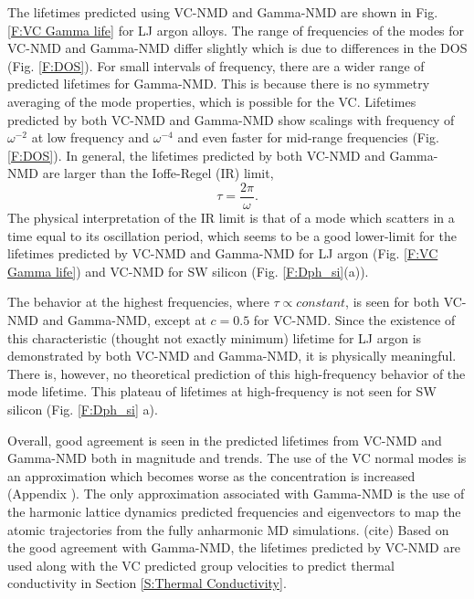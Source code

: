 \documentclass[aps,prb,twocolumn,superscriptaddress,amsmath,amssymb,floatfix]{revtex4}
\begin{document}
The lifetimes predicted using VC-NMD and Gamma-NMD  
are shown in Fig. \ref{F:VC Gamma life} for LJ argon alloys. 
The range of frequencies of the modes for 
VC-NMD and Gamma-NMD differ slightly  
which is due to differences in the DOS (Fig. \ref{F:DOS}). 
For small intervals of frequency, there are a wider range of 
predicted lifetimes for Gamma-NMD. This is because there is no symmetry 
averaging of the mode properties, which is possible for the VC.
Lifetimes predicted by both VC-NMD and Gamma-NMD show scalings with 
frequency of $\omega^{-2}$ at low frequency and $\omega^{-4}$ and 
even faster for mid-range frequencies (Fig. \ref{F:DOS}). 
In general, the lifetimes predicted by both VC-NMD and Gamma-NMD  
are larger than the Ioffe-Regel (IR) limit,
\cite{taraskin_determination_1999} 
\begin{equation}\label{EQ:IR}
\tau = \frac{2\pi}{\omega}.
\end{equation}
The physical interpretation of the IR limit is that of a mode which 
scatters in a time equal to its oscillation period, which seems to 
be a good lower-limit for the lifetimes predicted by VC-NMD and Gamma-NMD 
for LJ argon (Fig. \ref{F:VC Gamma life}) 
and VC-NMD for SW silicon (Fig. \ref{F:Dph_si}(a)). 

The behavior at the highest frequencies, 
where $\tau \propto constant$, is seen for both VC-NMD and Gamma-NMD, 
except at $c=0.5$ for VC-NMD.  
Since the existence of this 
characteristic (thought not exactly minimum) lifetime for LJ argon is 
demonstrated by both VC-NMD and Gamma-NMD, it is physically 
meaningful. There is, however, no theoretical 
prediction of this high-frequency behavior of the mode lifetime.
\cite{kittel_interpretation_1949,cahill_lattice_1988,
graebner_phonon_1986} This 
plateau of lifetimes at high-frequency is not seen for SW 
silicon (Fig. \ref{F:Dph_si} a). 

Overall, good agreement is seen in the predicted lifetimes from VC-NMD and 
Gamma-NMD both in magnitude and trends. The use of the VC normal modes 
is an approximation which becomes worse as the concentration is increased 
(Appendix ). The only approximation associated with Gamma-NMD is the use  
of the harmonic lattice dynamics predicted frequencies and eigenvectors 
to map the atomic trajectories from the fully anharmonic MD simulations.
(cite) 
Based on the good agreement with Gamma-NMD, the 
lifetimes predicted by VC-NMD are used along with the VC predicted 
group velocities to 
predict thermal conductivity in Section \ref{S:Thermal Conductivity}. 
\end{document}
